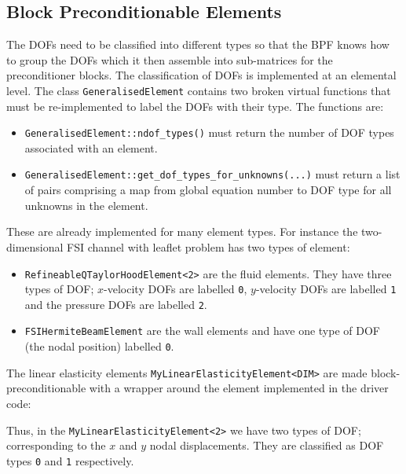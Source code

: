 \subsection{Block Preconditionable Elements\label{sec:block_preconditionable_elements}}
The DOFs need to be classified into different types so that the BPF knows how
to group the DOFs which it then assemble into sub-matrices for the 
preconditioner blocks. The classification of DOFs is implemented at an 
elemental level. The class \texttt{GeneralisedElement} contains two broken 
virtual functions that must be re-implemented to label the DOFs with their 
type. The functions are:
\begin{itemize}
\item \texttt{GeneralisedElement::ndof\_types()} must return the number of DOF 
types associated with an element.
\item \texttt{GeneralisedElement::get\_dof\_types\_for\_unknowns(...)} 
must return a list of pairs comprising a map from global equation number to DOF
type for all unknowns in the element.
\end{itemize}
These are already implemented for many element types. For instance the 
two-dimensional FSI channel with leaflet problem has two types of element:
\begin{itemize}
\item \texttt{RefineableQTaylorHoodElement<2>} are the fluid elements. They have
three types of DOF; $x$-velocity DOFs are labelled \texttt{0}, $y$-velocity DOFs
are labelled \texttt{1} and the pressure DOFs are labelled \texttt{2}.
\item \texttt{FSIHermiteBeamElement} are the wall elements and have one type of
  DOF (the nodal position) labelled \texttt{0}.
\end{itemize}
The linear elasticity elements \texttt{MyLinearElasticityElement<DIM>} are made 
block-preconditionable with a wrapper around the element implemented in the 
driver code:
\lstset{numberfirstline=true,numberstyle=\scriptsize,breaklines=true, numbers=left, stepnumber=2, frame=single,basicstyle=\ttfamily\scriptsize, showstringspaces=false, language=C++}

Thus, in the \texttt{MyLinearElasticityElement<2>} we have two types of DOF; 
corresponding to the $x$ and $y$ nodal displacements. They are classified as 
DOF types \texttt{0} and \texttt{1} respectively.


